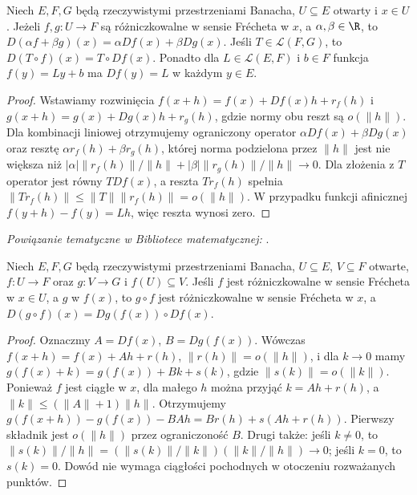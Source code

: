 \begin{stwierdzenie}
\label{prop:sum-linear14}
Niech $E,F,G$ będą rzeczywistymi przestrzeniami Banacha, $U\subseteq E$ otwarty i $x\in U$. Jeżeli $f,g:U\to F$ są różniczkowalne w sensie Frécheta w $x$, a $\alpha,\beta\in\R$, to $D(\alpha f+\beta g)(x)=\alpha Df(x)+\beta Dg(x)$. Jeśli $T\in\mathcal L(F,G)$, to $D(T\circ f)(x)=T\circ Df(x)$. Ponadto dla $L\in\mathcal L(E,F)$ i $b\in F$ funkcja $f(y)=Ly+b$ ma $Df(y)=L$ w każdym $y\in E$.
\end{stwierdzenie}
\begin{proof}
Wstawiamy rozwinięcia $f(x+h)=f(x)+Df(x)h+r_f(h)$ i $g(x+h)=g(x)+Dg(x)h+r_g(h)$, gdzie normy obu reszt są $o(\|h\|)$. Dla kombinacji liniowej otrzymujemy ograniczony operator $\alpha Df(x)+\beta Dg(x)$ oraz resztę $\alpha r_f(h)+\beta r_g(h)$, której norma podzielona przez $\|h\|$ jest nie większa niż $|\alpha|\|r_f(h)\|/\|h\|+|\beta|\|r_g(h)\|/\|h\|\to0$. Dla złożenia z $T$ operator jest równy $TDf(x)$, a reszta $Tr_f(h)$ spełnia $\|Tr_f(h)\|\le\|T\|\|r_f(h)\|=o(\|h\|)$. W przypadku funkcji afinicznej $f(y+h)-f(y)=Lh$, więc reszta wynosi zero.
\end{proof}

\noindent\emph{Powiązanie tematyczne w Bibliotece matematycznej:} .

\begin{twierdzenie}
\label{thm:chain14}
Niech $E,F,G$ będą rzeczywistymi przestrzeniami Banacha, $U\subseteq E$, $V\subseteq F$ otwarte, $f:U\to F$ oraz $g:V\to G$ i $f(U)\subseteq V$. Jeśli $f$ jest różniczkowalne w sensie Frécheta w $x\in U$, a $g$ w $f(x)$, to $g\circ f$ jest różniczkowalne w sensie Frécheta w $x$, a
$D(g\circ f)(x)=Dg(f(x))\circ Df(x)$.
\end{twierdzenie}
\begin{proof}
Oznaczmy $A=Df(x)$, $B=Dg(f(x))$. Wówczas $f(x+h)=f(x)+Ah+r(h)$, $\|r(h)\|=o(\|h\|)$, i dla $k\to0$ mamy $g(f(x)+k)=g(f(x))+Bk+s(k)$, gdzie $\|s(k)\|=o(\|k\|)$. Ponieważ $f$ jest ciągłe w $x$, dla małego $h$ można przyjąć $k=Ah+r(h)$, a $\|k\|\le(\|A\|+1)\|h\|$. Otrzymujemy
$g(f(x+h))-g(f(x))-BAh=Br(h)+s(Ah+r(h))$.
Pierwszy składnik jest $o(\|h\|)$ przez ograniczoność $B$. Drugi także: jeśli $k\ne0$, to
$\|s(k)\|/\|h\|=(\|s(k)\|/\|k\|)(\|k\|/\|h\|)\to0$;
jeśli $k=0$, to $s(k)=0$. Dowód nie wymaga ciągłości pochodnych w otoczeniu rozważanych punktów.
\end{proof}

